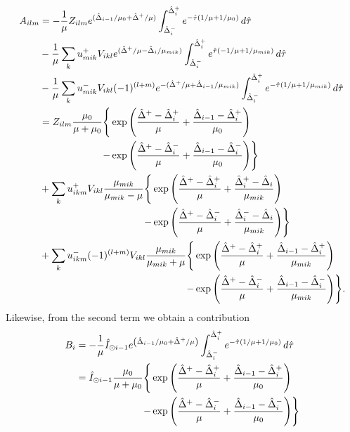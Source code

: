 \begin{equation}
\begin{split}
A_{ilm} &= -{1\over\mu}Z_{ilm} e^{(\hat\Delta_{i-1}/\mu_0+\hat\Delta^+/\mu)}
\int_{\hat\Delta_i^-}^{\hat\Delta_i^+} 
e^{-\hat\tau (1/\mu+1/\mu_0)} \, d\hat\tau \\
&-{1\over\mu}\sum_k  u_{mik}^+ V_{ikl} 
e^{(\hat\Delta^+/\mu-\hat\Delta_i/\mu_{mik})} 
\int_{\hat\Delta_i^-}^{\hat\Delta_i^+} 
e^{\hat\tau (-1/\mu+1/\mu_{mik})}\, d\hat\tau
\\
&- {1\over\mu}\sum_k u_{mik}^- V_{ikl} (-1)^{(l+m)} 
e^{-(\hat\Delta^+/\mu+\hat\Delta_{i-1}/\mu_{mik})}
\int_{\hat\Delta_i^-}^{\hat\Delta_i^+} 
e^{-\hat\tau (1/\mu+1/\mu_{mik})}\, d\hat\tau
\\
&= Z_{ilm} {\mu_0\over{\mu+\mu_0}}
\begin{aligned}[t] 
\Biggl \{ &\exp \left ( {{\hat\Delta^+-\hat\Delta_i^+}\over\mu}
+{{\hat\Delta_{i-1}-\hat\Delta_i^+}\over\mu_0} \right) \\
- &\exp \left ( {{\hat\Delta^+-\hat\Delta_i^-}\over\mu}
+{{\hat\Delta_{i-1}-\hat\Delta_i^-}\over\mu_0} \right) \Biggr \} 
\end{aligned} \\
&+ \sum_k u_{ikm}^+ V_{ikl} {\mu_{mik}\over{\mu_{mik}-\mu}}
\begin{aligned}[t] 
\Biggl \{ &\exp \left ( {{\hat\Delta^+-\hat\Delta_i^+}\over\mu}
+{{\hat\Delta_i^+-\hat\Delta_i}\over\mu_{mik}} \right) \\
- &\exp \left ( {{\hat\Delta^+-\hat\Delta_i^-}\over\mu}
+{{\hat\Delta_i^--\hat\Delta_i}\over\mu_{mik}} \right) \Biggr \} 
\end{aligned} \\
&+ \sum_k u_{ikm}^- (-1)^{(l+m)} V_{ikl} 
{\mu_{mik}\over{\mu_{mik}+\mu}}
\begin{aligned}[t] 
\Biggl \{ &\exp \left ( {{\hat\Delta^+-\hat\Delta_i^+}\over\mu}
+{{\hat\Delta_{i-1}-\hat\Delta_i^+}\over\mu_{mik}} \right) \\
- &\exp \left ( {{\hat\Delta^+-\hat\Delta_i^-}\over\mu}
+{{\hat\Delta_{i-1}-\hat\Delta_i^-}\over\mu_{mik}} \right) \Biggr \} .
\end{aligned}
\end{split}
\end{equation}
Likewise, from the second term we obtain a contribution
\begin{equation}
\begin{split}
B_i &= -{1\over\mu} \hat I_{\odot i-1}
e^{\left(\hat\Delta_{i-1}/\mu_0+\hat\Delta^+/\mu\right)}
\int_{\hat\Delta_i^-}^{\hat\Delta_i^+} e^{-\hat\tau (1/\mu+1/\mu_0)} 
\, d\hat\tau \\
&= \hat I_{\odot i-1}
{\mu_0\over{\mu+\mu_0}} 
\begin{aligned}[t]
\Biggl \{ &\exp \left ( {{\hat\Delta^+-\hat\Delta_i^+}\over\mu}
+{{\hat\Delta_{i-1}-\hat\Delta_i^+}\over\mu_0} \right) \\
-& \exp \left ( {{\hat\Delta^+-\hat\Delta_i^-}\over\mu}
+{{\hat\Delta_{i-1}-\hat\Delta_i^-}\over\mu_0} \right) \Biggr \} 
\end{aligned}
\end{split}
\end{equation}

